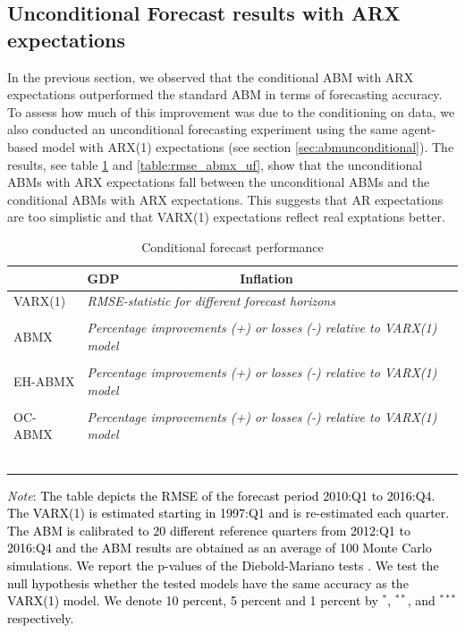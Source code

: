 {\subsection{Unconditional Forecast results with ARX expectations}
In the previous section, we observed that the conditional ABM with ARX expectations outperformed the standard ABM in terms of forecasting accuracy. To assess how much of this improvement was due to the conditioning on data, we also conducted an unconditional forecasting experiment using the same agent-based model with ARX(1) expectations (see section \ref{sec:abmunconditional}). The results, see table \ref{table:rmse_validation_abmx_uf} and \ref{table:rmse_abmx_uf}, show that the unconditional ABMs with ARX expectations fall between the unconditional ABMs and the conditional ABMs with ARX expectations. This suggests that AR expectations are too simplistic and that VARX(1) expectations reflect real exptations better.
\begin{table}[!h]
	\caption{Conditional forecast performance} 
	\label{table:rmse_validation_abmx_uf}
	\centering
		\begin{tabular}{lll}
			\toprule
			& GDP & Inflation \\
			\midrule
			VARX(1) & \multicolumn{2}{l}{\textit{RMSE-statistic for different forecast horizons}} \\ \midrule
			
            \\ \midrule
   			ABMX & \multicolumn{2}{l}{\textit{Percentage improvements (+) or losses (-) relative to VARX(1) model}} \\	\midrule 
			\\ \midrule 
            EH-ABMX & \multicolumn{2}{l}{\textit{Percentage improvements (+) or losses (-) relative to VARX(1) model}} \\	\midrule 
			\\ \midrule 
			OC-ABMX & \multicolumn{2}{l}{\textit{Percentage improvements (+) or losses (-) relative to VARX(1) model}} \\	\midrule 
			\\ \bottomrule \
		\end{tabular}
	\begin{tablenotes}
		\footnotesize \item \textit{Note}: \textcolor{black}{The table depicts the RMSE of the forecast period 2010:Q1 to 201\textcolor{black}{6}:Q4. The VARX(1) is estimated starting in 1997:Q1 and is re-estimated each quarter. The ABM is calibrated to \textcolor{black}{20} different reference quarters from 2012:Q1 to \textcolor{black}{2016:Q4} and the ABM results are obtained as an average of 100 Monte Carlo simulations. We report the p-values of the Diebold-Mariano tests \citep{harveyTestingEqualityPrediction1997}.  We test the null hypothesis whether the tested models have the same accuracy as the VARX(1) model. We denote  10 percent, 5 percent and 1 percent by $^{*}$, $^{**}$, and $^{***}$ respectively.}
	\end{tablenotes}
\end{table}

}
